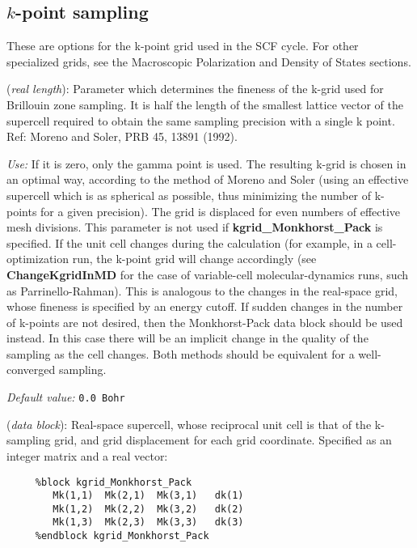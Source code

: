 \documentclass[11pt]{article}
\begin{document}
\subsection{$k$-point sampling}

These are options for the k-point grid used in the SCF cycle. For
other specialized grids, see the Macroscopic Polarization and Density
of States sections.

\begin{description}
\itemsep 10pt
\parsep 0pt


\item[{\bf kgrid\_cutoff}] ({\it real length}):
Parameter which determines
the fineness of the k-grid used for Brillouin zone sampling.
It is half the length of the smallest lattice vector of the supercell
required to obtain the same sampling precision with a single k point.
Ref: Moreno and Soler, PRB 45, 13891 (1992).

{\it Use:} If it is zero, only the gamma point is used.  The resulting
k-grid is chosen in an optimal way, according to the method of Moreno
and Soler (using an effective supercell which is as spherical as
possible, thus minimizing the number of k-points for a given
precision). The grid is displaced for even numbers of effective mesh
divisions.  This parameter is not used if {\bf kgrid\_Monkhorst\_Pack}
is specified. If the unit cell changes during the calculation (for
example, in a cell-optimization run, the k-point
grid will change accordingly (see {\bf ChangeKgridInMD} for the case
of variable-cell molecular-dynamics runs, such as Parrinello-Rahman).
This is analogous to the changes in the
real-space grid, whose fineness is specified by an energy cutoff. If
sudden changes in the number of k-points are not desired, then the
Monkhorst-Pack data block should be used instead. In this case there
will be an implicit change in the quality of the sampling as the cell
changes. Both methods should be equivalent for a well-converged
sampling.

{\it Default value:} {\tt 0.0 Bohr}


\item[{\bf kgrid\_Monkhorst\_Pack}] ({\it data block}):
Real-space supercell, whose reciprocal unit cell is that of the
k-sampling grid, and grid displacement for each grid coordinate.
Specified as an integer matrix and a real vector:

\begin{verbatim}
     %block kgrid_Monkhorst_Pack
        Mk(1,1)  Mk(2,1)  Mk(3,1)   dk(1)
        Mk(1,2)  Mk(2,2)  Mk(3,2)   dk(2)
        Mk(1,3)  Mk(2,3)  Mk(3,3)   dk(3)
     %endblock kgrid_Monkhorst_Pack
\end{verbatim}


\end{description}
\end{document}
